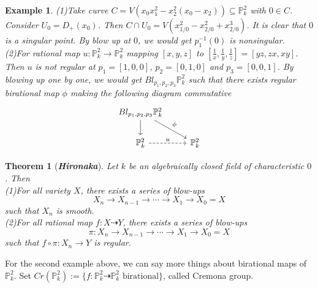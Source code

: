 \documentclass{ctexart}
\newtheorem{theorem}{Theorem}[section]
\newtheorem{example}{Example}[section]
\begin{document}
\begin{example}
    (1)Take curve $C = V(x_{0}x_{1}^{2} - x_{2}^{2}(x_{0} - x_{2})) \subseteq \mathbb{P}_{k}^{2}$ with $0\in C$.
    Consider $U_{0} = D_{+}(x_{0})$.
    Then $C \cap U_{0} = V(x_{1/0}^{2} - x_{2/0}^{2} + x_{2/0}^{3})$.
    It is clear that $0$ is a singular point.
    By blow up at $0$, we would get $p_{1}^{-1}(0)$ is nonsingular.
    \\
    (2)For rational map $u: \mathbb{P}_{k}^{2} \rightarrow \mathbb{P}_{k}^{2}$ mapping $[x, y, z]$ to $[\frac{1}{x}, \frac{1}{y}, \frac{1}{z}] = [yz, zx, xy]$.
    Then $u$ is not regular at $p_{1} = [1, 0, 0]$, $p_{2} = [0, 1, 0]$ and $p_{3} = [0, 0, 1]$.
    By blowing up one by one, we would get $Bl_{p_{1}, p_{2}, p_{3}}\mathbb{P}_{k}^{2}$ such that there exists regular birational map $\phi$ making the following diagram commutative
    \begin{equation}
        \begin{tikzcd}
            Bl_{p_{1}, p_{2}, p_{3}}\mathbb{P}_{k}^{2} \arrow[dr, rightarrow, "\phi"] \arrow[d] & \\
            \mathbb{P}_{k}^{2} \arrow[r, dashrightarrow, "u"] &
            \mathbb{P}_{k}^{2}
        \end{tikzcd}
    \end{equation}
\end{example}
\begin{theorem}[\textbf{\emph{Hironaka}}]
    Let $k$ be an algebraically closed field of characteristic $0$.
    Then \\
    (1)For all variety $X$, there exists a series of blow-ups 
    \begin{equation}
        X_{n} \longrightarrow X_{n - 1} \longrightarrow \cdots \longrightarrow X_{1} \longrightarrow X_{0} = X
    \end{equation}
    such that $X_{n}$ is smooth. \\
    (2)For all rational map $f: X \dashrightarrow Y$, there exists a series of blow-ups 
    \begin{equation}
        \pi: X_{n} \longrightarrow X_{n - 1} \longrightarrow \cdots \longrightarrow X_{1} \longrightarrow X_{0} = X
    \end{equation}
    such that $f \circ \pi: X_{n} \rightarrow Y$ is regular.
    \label{Theorem 3.1}
\end{theorem}
For the second example above, we can say more things about birational maps of $\mathbb{P}_{k}^{2}$.
Set $Cr(\mathbb{P}_{k}^{2}) := \{f: \mathbb{P}_{k}^{2} \dashrightarrow \mathbb{P}_{k}^{2} \text{ birational}\}$, called Cremona group.
\end{document}
